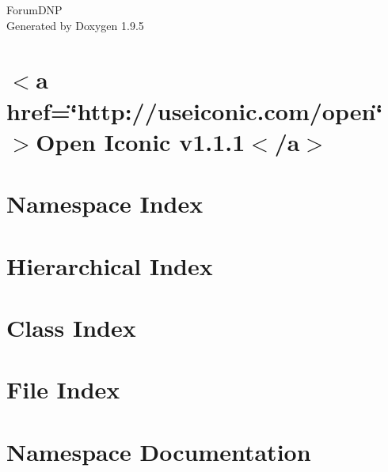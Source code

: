 \documentclass[twoside]{book}
\newcommand{\+}{\discretionary{\mbox{\scriptsize$\hookleftarrow$}}{}{}}
\newcommand{\clearemptydoublepage}{%
    \newpage{\pagestyle{empty}\cleardoublepage}%
  }
\begin{document}
  \raggedbottom
    \hypersetup{pageanchor=false,
                bookmarksnumbered=true,
                pdfencoding=unicode
               }
  \begin{titlepage}
  \vspace*{7cm}
  \begin{center}%
  {\Large Forum\+DNP}\\
  \vspace*{1cm}
  {\large Generated by Doxygen 1.9.5}\\
  \end{center}
  \end{titlepage}
  \clearemptydoublepage
  \tableofcontents
  \clearemptydoublepage
  \hypersetup{pageanchor=true}
\chapter{\texorpdfstring{$<$}{<}a href=\char`\"{}http\+://useiconic.\+com/open\char`\"{} \texorpdfstring{$>$}{>}Open Iconic v1.1.1\texorpdfstring{$<$}{<}/a\texorpdfstring{$>$}{>}}
\label{md__c___users_fisch__documents__git_hub__d_n_p__assignment__forum_d_n_p__blazor_w_a_s_m_wwwroot_css_open_iconic__r_e_a_d_m_e}

\chapter{Namespace Index}

\chapter{Hierarchical Index}

\chapter{Class Index}

\chapter{File Index}

\chapter{Namespace Documentation}


\end{document}
